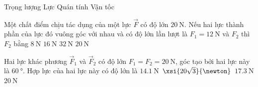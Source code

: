 \begin{ex}
	\choice
	{Trọng lượng}
	{Lực}
	{\True Quán tính}
	{Vận tốc}
	\loigiai{}
\end{ex}
\begin{ex}
	Một chất điểm chịu tác dụng của một lực $\vec{F}$ có độ lớn $\SI{20}{\newton}$. Nếu hai lực thành phần của lực đó vuông góc với nhau	và có độ lớn lần lượt là $F_1=\SI{12}{\newton}$ và $F_2$ thì $F_2$ bằng
	\choice
	{\True $\SI{8}{\newton}$}
	{$\SI{16}{\newton}$}
	{$\SI{32}{\newton}$}
	{$\SI{20}{\newton}$}
	\loigiai{}
\end{ex}
\begin{ex}
	Hai lực khác phương $\vec{F}_1$ và $\vec{F}_2$ có độ lớn $F_1=F_2=\SI{20}{\newton}$, góc tạo bởi hai lực này là $\SI{60}{\degree}$. Hợp lực của hai lực này có độ lớn là	
	\choice
	{$\SI{14.1}{\newton}$}
	{\True $\xsi{20\sqrt{3}}{\newton}$}
	{$\SI{17.3}{\newton}$}
	{$\SI{20}{\newton}$}
	\loigiai{}
\end{ex}
